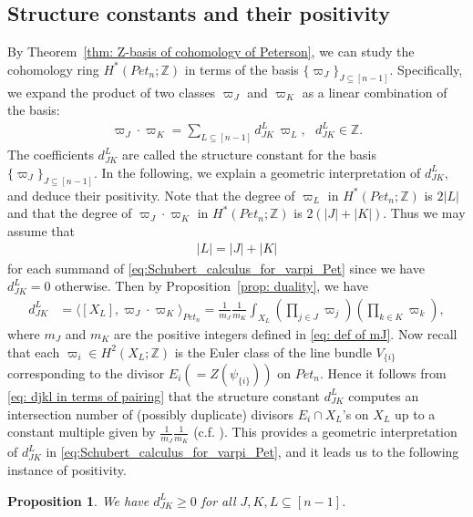 \documentclass[11pt]{article}
\newtheorem{prop}[theo]{Proposition}
\theoremstyle{definition}
\numberwithin{equation}{section}
\numberwithin{equation}{section}
\begin{document}
\subsection{Structure constants and their positivity}\label{subsec: positivity}
By Theorem~\ref{thm: Z-basis of cohomology of Peterson}, we can study the cohomology ring $H^*(Pet_{n};{\mathbb Z})$ in terms of the basis $\{\varpi_J\}_{J\subseteq[n-1]}$. Specifically, we expand the product of two classes $\varpi_J$ and $\varpi_K$ as a linear combination of the basis:
\begin{align} \label{eq:Schubert_calculus_for_varpi_Pet} 
\varpi_J \cdot \varpi_K =\sum_{L \subseteq [n-1]} d_{JK}^L \, \varpi_L, \ \ \ d_{JK}^L \in {\mathbb Z}.
\end{align}
The coefficients $d_{JK}^L$ are called the structure constant for the basis $\{\varpi_J\}_{J\subseteq[n-1]}$. In the following, we explain a geometric interpretation of $d_{JK}^L$, and deduce  their positivity. Note that the degree of $\varpi_L$ in $H^*(Pet_{n};{\mathbb Z})$ is $2|L|$ and that the degree of $\varpi_J \cdot \varpi_K$ in $H^*(Pet_{n};{\mathbb Z})$ is $2(|J|+|K|)$. Thus we may assume that 
\begin{align} \label{eq: degree of piL}
|L|=|J|+|K|
\end{align}
for each summand of \eqref{eq:Schubert_calculus_for_varpi_Pet} since we have $d_{JK}^L =0$ otherwise. Then by Proposition~\ref{prop: duality}, we have
\begin{align}\label{eq: djkl in terms of pairing}
d_{JK}^L 
&= \langle [X_{L}] , \varpi_{J} \cdot \varpi_{K} \rangle_{Pet_{n}} 
= \frac{1}{m_J}
\frac{1}{m_K}\int_{X_L} \left(\prod_{j\in J}\varpi_j\right)\left(\prod_{k\in K}\varpi_k\right) , 
\end{align}
where $m_J$ and $m_K$ are the positive integers defined in \eqref{eq: def of mJ}. Now recall that each $\varpi_i\in H^2(X_L;{\mathbb Z})$ is the Euler class of the line bundle $V_{\{i\}}$ corresponding to the divisor $E_i(=Z(\psi_{\{i\}}))$ on $Pet_{n}$. Hence it follows from \eqref{eq: djkl in terms of pairing} that the structure constant $d_{JK}^L$ computes an intersection number of (possibly duplicate) divisors $E_i\cap X_L$'s on $X_L$ up to a constant multiple given by $\frac{1}{m_J}\frac{1}{m_K}$ (c.f. \cite[Sect.\ 1.1.C]{Lazarsfeld}). This provides a geometric interpretation of $d_{JK}^L$ in \eqref{eq:Schubert_calculus_for_varpi_Pet}, and it leads us to the following instance of positivity.

\begin{prop}\label{prop: positivity}
We have $d_{JK}^L \ge0$ for all $J,K,L\subseteq [n-1]$.
\end{prop}
\end{document}
